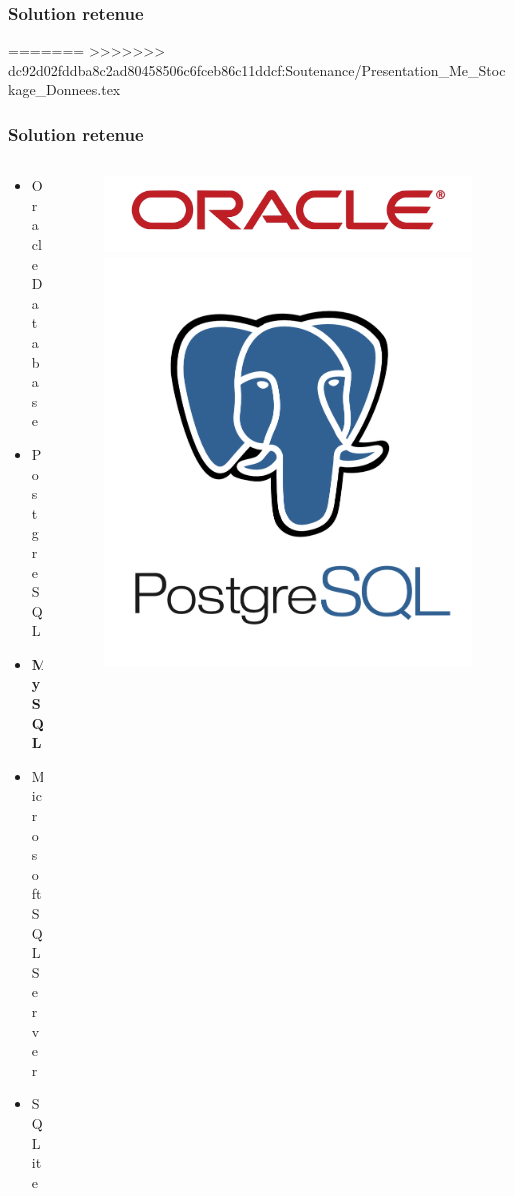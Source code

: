 \subsubsection[Solution retenue]{Solution retenue}
=======
>>>>>>> dc92d02fddba8c2ad80458506c6fceb86c11ddcf:Soutenance/Presentation_Me_Stockage_Donnees.tex
\begin{frame}
\frametitle{Solution retenue}
\begin{columns}
\begin{column}{5cm}
\begin{itemize}
	\item Oracle Database
	\item PostgreSQL
	\item \textbf{MySQL}
	\item Microsoft SQL Server
	\item SQLite
\end{itemize}
\end{column}
\begin{column}{7cm}
\begin{figure}
\includegraphics[scale=0.038]{Images/Oracle}
\includegraphics[scale=0.18]{Images/PostgreSQL}\\

\end{figure}
\end{column}
\end{columns}
\end{frame}
